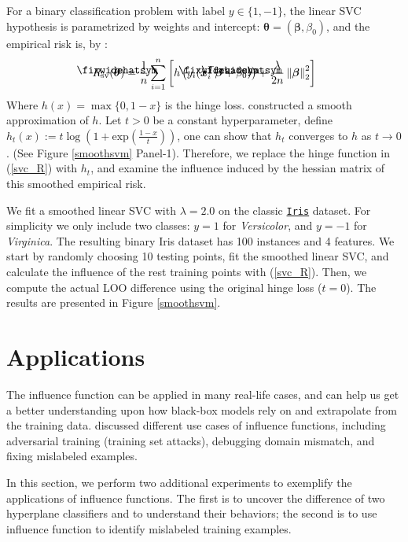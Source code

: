 \documentclass{article}
\newcommand\lowerwidehatsym{%
  \text{\smash{\raisebox{-1.3ex}{%
    $\fixwidehatsym$}}}}
\newcommand\fixwidehat[1]{%
  \mathchoice
    {\accentset{\displaystyle\lowerwidehatsym}{#1}}
    {\accentset{\textstyle\lowerwidehatsym}{#1}}
    {\accentset{\scriptstyle\lowerwidehatsym}{#1}}
    {\accentset{\scriptscriptstyle\lowerwidehatsym}{#1}}
}
\begin{document}
For a binary classification problem with label $y\in\{1,-1\}$, the linear SVC hypothesis is parametrized by weights and intercept: $\bm{\theta} = (\bm{\beta}, \beta_0)$, and the empirical risk is, by \cite{ESL}:
\begin{align}\label{svc_R}
\vspace{-0.2in}
R_{\text{sv}}(\fixwidehat{\bm{\theta}}) = \frac{1}{n}\sum_{i=1}^n \left[h\left(y_i(\bm{x}_i^{\top} \fixwidehat{\bm{\beta}} + \fixwidehat{\beta_0})\right) + \frac{\lambda}{2n} \left\lVert \bm{\beta}\right\rVert_2^2\right]
\vspace{-0.2in}
\end{align}
Where $h(x) = \max\{0, 1-x\}$ is the hinge loss. \cite{koh2017} constructed a smooth approximation of $h$. Let $t>0$ be a constant hyperparameter, define $h_t(x) := t\log(1+\text{exp}(\frac{1-x}{t}))$, one can show that $h_t$ converges to $h$ as $t\to 0$. (See Figure \ref{smoothsvm} Panel-1). Therefore, we replace the hinge function in (\ref{svc_R}) with $h_t$, and examine the influence induced by the hessian matrix of this smoothed empirical risk.

We fit a smoothed linear SVC with $\lambda = 2.0$ on the classic \href{https://archive.ics.uci.edu/ml/datasets/iris}{\texttt{Iris}} dataset. For simplicity we only include two classes: $y=1$ for \emph{Versicolor}, and $y=-1$ for \emph{Virginica}. The resulting binary Iris dataset has 100 instances and 4 features. We start by randomly choosing 10 testing points, fit the smoothed linear SVC, and calculate the influence of the rest training points with (\ref{svc_R}). Then, we compute the actual LOO difference using the original hinge loss ($t=0$). The results are presented in Figure \ref{smoothsvm}. 


\section{Applications}
The influence function can be applied in many real-life cases, and can help us get a better understanding upon how black-box models rely on and extrapolate from the training data. \cite{koh2017} discussed different use cases of influence functions, including adversarial training (training set attacks), debugging domain mismatch, and fixing mislabeled examples.

In this section, we perform two additional experiments to exemplify the applications of influence functions. The first is to uncover the difference of two hyperplane classifiers and to understand their behaviors; the second is to use influence function to identify mislabeled training examples.
\end{document}
